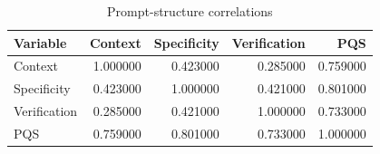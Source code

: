 \begin{table}
\caption{Prompt-structure correlations}
\label{tab:appendix-b-correlations}
\begin{tabular}{lrrrr}
\toprule
Variable & Context & Specificity & Verification & PQS \\
\midrule
Context & 1.000000 & 0.423000 & 0.285000 & 0.759000 \\
Specificity & 0.423000 & 1.000000 & 0.421000 & 0.801000 \\
Verification & 0.285000 & 0.421000 & 1.000000 & 0.733000 \\
PQS & 0.759000 & 0.801000 & 0.733000 & 1.000000 \\
\bottomrule
\end{tabular}
\end{table}
